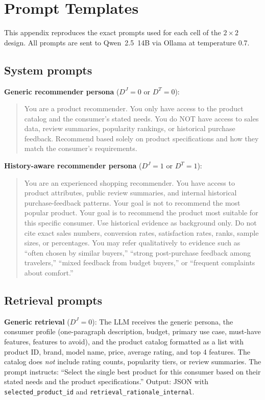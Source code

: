 \documentclass[11pt]{article}
\newcommand{\Qreg}{D^J}
\newcommand{\Rreg}{D^T}
\begin{document}
\section{Prompt Templates}\label{section:prompts}

This appendix reproduces the exact prompts used for each cell of the $2 \times 2$ design. All prompts are sent to Qwen~2.5~14B via Ollama at temperature 0.7.

\subsection{System prompts}

\textbf{Generic recommender persona} ($\Qreg = 0$ or $\Rreg = 0$):

\begin{quote}
\small\ttfamily
You are a product recommender. You only have access to the product catalog and the consumer's stated needs. You do NOT have access to sales data, review summaries, popularity rankings, or historical purchase feedback. Recommend based solely on product specifications and how they match the consumer's requirements.
\end{quote}

\textbf{History-aware recommender persona} ($\Qreg = 1$ or $\Rreg = 1$):

\begin{quote}
\small\ttfamily
You are an experienced shopping recommender. You have access to product attributes, public review summaries, and internal historical purchase-feedback patterns. Your goal is not to recommend the most popular product. Your goal is to recommend the product most suitable for this specific consumer. Use historical evidence as background only. Do not cite exact sales numbers, conversion rates, satisfaction rates, ranks, sample sizes, or percentages. You may refer qualitatively to evidence such as ``often chosen by similar buyers,'' ``strong post-purchase feedback among travelers,'' ``mixed feedback from budget buyers,'' or ``frequent complaints about comfort.''
\end{quote}

\subsection{Retrieval prompts}

\textbf{Generic retrieval} ($\Qreg = 0$): The LLM receives the generic persona, the consumer profile (one-paragraph description, budget, primary use case, must-have features, features to avoid), and the product catalog formatted as a list with product ID, brand, model name, price, average rating, and top 4 features. The catalog does \emph{not} include rating counts, popularity tiers, or review summaries. The prompt instructs: ``Select the single best product for this consumer based on their stated needs and the product specifications.'' Output: JSON with \texttt{selected\_product\_id} and \texttt{retrieval\_rationale\_internal}.
\end{document}
